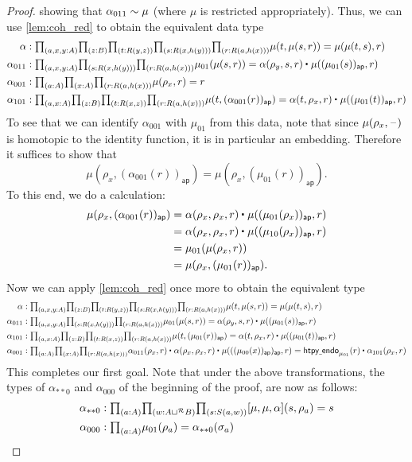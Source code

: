 \begin{proof}
showing that $\alpha_{011}\sim \mu$ (where $\mu$ is restricted appropriately). Thus, we can use \autoref{lem:coh_red} to obtain the equivalent data type
\begin{align*}
\alpha & : \prd{a,x,y:A}{z:B}{t:R(y,z)}{s:R(x,h(y))}{r:R(a,h(x))} \mu(t,\mu(s,r)) = \mu(\mu(t,s),r) \\
\alpha_{011} & : \prd{a,x,y:A}{s:R(x,h(y))}{r:R(a,h(x))} \mu_{01}(\mu(s,r))=\ct{\alpha(\rho_y,s,r)}{\mu((\mu_{01}(s))_{\mathsf{ap}},r)} \\
\alpha_{001} & : \prd{a:A}{x:A}{r:R(a,h(x))} \mu(\rho_x,r)=r \\
\alpha_{101} & : \prd{a,x:A}{z:B}{t:R(x,z)}{r:R(a,h(x))} \mu(t,(\alpha_{001}(r))_{\mathsf{ap}})=\ct{\alpha(t,\rho_x,r)}{\mu((\mu_{01}(t))_{\mathsf{ap}},r)}
\end{align*}
To see that we can identify $\alpha_{001}$ with $\mu_{01}$ from this data, note that since $\mu(\rho_x,\mathord{\hspace{1pt}\text{--}\hspace{1pt}})$ is homotopic to the identity function, it is in particular an embedding. Therefore it suffices to show that
\begin{equation*}
\mu(\rho_x,(\alpha_{001}(r))_{\mathsf{ap}})= \mu(\rho_x,(\mu_{01}(r))_{\mathsf{ap}}).
\end{equation*}
To this end, we do a calculation:
\begin{align*}
\mu(\rho_x,(\alpha_{001}(r))_{\mathsf{ap}})
& = \ct{\alpha(\rho_x,\rho_x,r)}{\mu((\mu_{01}(\rho_x))_{\mathsf{ap}},r)} \\
& = \ct{\alpha(\rho_x,\rho_x,r)}{\mu((\mu_{10}(\rho_x))_{\mathsf{ap}},r)} \\
& = \mu_{01}(\mu(\rho_x,r)) \\
& = \mu(\rho_x,(\mu_{01}(r))_{\mathsf{ap}}).
\end{align*}
Now we can apply \autoref{lem:coh_red} once more to obtain the equivalent type
\begin{align*}
\alpha & : \prd{a,x,y:A}{z:B}{t:R(y,z)}{s:R(x,h(y))}{r:R(a,h(x))} \mu(t,\mu(s,r)) = \mu(\mu(t,s),r) \\
\alpha_{011} & : \prd{a,x,y:A}{s:R(x,h(y))}{r:R(a,h(x))} \mu_{01}(\mu(s,r))=\ct{\alpha(\rho_y,s,r)}{\mu((\mu_{01}(s))_{\mathsf{ap}},r)} \\
\alpha_{101} & : \prd{a,x:A}{z:B}{t:R(x,z)}{r:R(a,h(x))} \mu(t,(\mu_{01}(r))_{\mathsf{ap}})=\ct{\alpha(t,\rho_x,r)}{\mu((\mu_{01}(t))_{\mathsf{ap}},r)} \\
\alpha_{001} & : \prd{a:A}{x:A}{r:R(a,h(x))} \ct{\alpha_{011}(\rho_x,r)}{\ct{\alpha(\rho_x,\rho_x,r)}{\mu(((\mu_{00}(x))_{\mathsf{ap}})_{\mathsf{ap}},r)}}=\ct{\mathsf{htpy\usc{}endo}_{\mu_{01}}(r)}{\alpha_{101}(\rho_x,r)}
\end{align*}
This completes our first goal. Note that under the above transformations, the types of $\alpha_{\ast\ast 0}$ and $\alpha_{000}$ of the beginning of the proof, are now as follows:
\begin{align*}
\alpha_{\ast\ast 0} & : \prd{a:A}{w:A\sqcup^{\mathcal{R}} B}{s:S(a,w)} [\mu,\mu,\alpha](s,\rho_a)=s \\
\alpha_{000} & : \prd{a:A} \mu_{01}(\rho_a)=\alpha_{\ast\ast 0}(\sigma_a)
\end{align*}
\end{proof}

